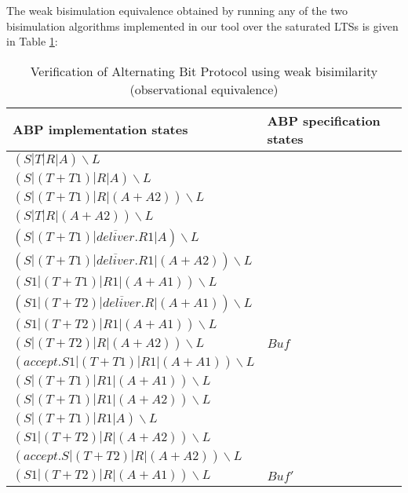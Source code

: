 The weak bisimulation equivalence obtained by running any of the two bisimulation algorithms implemented in our tool over the saturated LTSs is given in Table \ref{table3}:

\begin{table}
\begin{tabular}{| p{6.5cm} | p{3.5cm} | }
	
  \hline                       
	ABP implementation states &
	ABP specification states
	\\ \hline
	
$\left(S|T|R|A\right)\backslash L$ & \\
$\left(S|\left(T+T1\right)|R|A\right)\backslash L$ & \\
$\left(S|\left(T+T1\right)|R|\left(A+A2\right)\right)\backslash L$ & \\
$\left(S|T|R|\left(A+A2\right)\right)\backslash L$ & \\
$\left(S|\left(T+T1\right)|\overline{deliver}.R1|A\right)\backslash L$ & \\
$\left(S|\left(T+T1\right)|\overline{deliver}.R1|\left(A+A2\right)\right)\backslash L$ & \\
$\left(S1|\left(T+T1\right)|R1|\left(A+A1\right)\right)\backslash L$ & \\
$\left(S1|\left(T+T2\right)|\overline{deliver}.R|\left(A+A1\right)\right)\backslash L$ & \\
$\left(S1|\left(T+T2\right)|R1|\left(A+A1\right)\right)\backslash L$ & \\
$\left(S|\left(T+T2\right)|R|\left(A+A2\right)\right)\backslash L$ &
  $Buf$   
  \\ \hline
   
$\left(accept.S1|\left(T+T1\right)|R1|\left(A+A1\right)\right)\backslash L$ & \\ 
$\left(S|\left(T+T1\right)|R1|\left(A+A1\right)\right)\backslash L$ & \\
$\left(S|\left(T+T1\right)|R1|\left(A+A2\right)\right)\backslash L$ & \\
$\left(S|\left(T+T1\right)|R1|A\right)\backslash L$ & \\
$\left(S1|\left(T+T2\right)|R|\left(A+A2\right)\right)\backslash L$ & \\
$\left(accept.S|\left(T+T2\right)|R|\left(A+A2\right)\right)\backslash L$ & \\
$\left(S1|\left(T+T2\right)|R|\left(A+A1\right)\right)\backslash L$ &
  $Buf'$
  \\ \hline  
\end{tabular}
\\
\caption{Verification of Alternating Bit Protocol using weak bisimilarity (observational equivalence)}
\label{table3}
\end{table}
